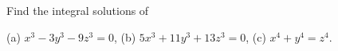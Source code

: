 Find the integral solutions of

(a) $x^3 - 3y^3 - 9z^3 = 0$, (b) $5x^3 + 11y^3 + 13z^3 = 0$, (c) $x^4 + y^4 = z^4$.
